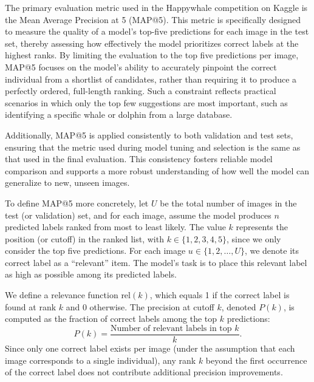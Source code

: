 \documentclass[twocolumn]{article}
\begin{document}
The primary evaluation metric used in the Happywhale competition on Kaggle is the Mean Average Precision at 5 (MAP@5). This metric is specifically designed to measure the quality of a model’s top-five predictions for each image in the test set, thereby assessing how effectively the model prioritizes correct labels at the highest ranks. By limiting the evaluation to the top five predictions per image, MAP@5 focuses on the model’s ability to accurately pinpoint the correct individual from a shortlist of candidates, rather than requiring it to produce a perfectly ordered, full-length ranking. Such a constraint reflects practical scenarios in which only the top few suggestions are most important, such as identifying a specific whale or dolphin from a large database. 

Additionally, MAP@5 is applied consistently to both validation and test sets, ensuring that the metric used during model tuning and selection is the same as that used in the final evaluation. This consistency fosters reliable model comparison and supports a more robust understanding of how well the model can generalize to new, unseen images.

To define MAP@5 more concretely, let \( U \) be the total number of images in the test (or validation) set, and for each image, assume the model produces \( n \) predicted labels ranked from most to least likely. The value \( k \) represents the position (or cutoff) in the ranked list, with \( k \in \{1, 2, 3, 4, 5\} \), since we only consider the top five predictions. For each image \( u \in \{1, 2, \ldots, U\} \), we denote its correct label as a “relevant” item. The model’s task is to place this relevant label as high as possible among its predicted labels. 

We define a relevance function \( \text{rel}(k) \), which equals 1 if the correct label is found at rank \( k \) and 0 otherwise. The precision at cutoff \( k \), denoted \( P(k) \), is computed as the fraction of correct labels among the top \( k \) predictions:
\begin{equation}
P(k) = \frac{\text{Number of relevant labels in top } k}{k}.
\end{equation}
Since only one correct label exists per image (under the assumption that each image corresponds to a single individual), any rank \( k \) beyond the first occurrence of the correct label does not contribute additional precision improvements.
\end{document}
